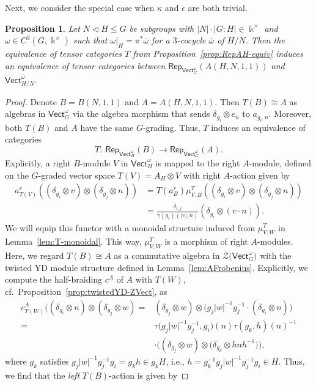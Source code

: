 \documentclass[10pt,a4paper]{amsart}
\numberwithin{equation}{section}
\newtheorem{Proposition}[Theorem]{Proposition}
 { \theoremstyle{definition}
\newtheorem{Definition}[Theorem]{Definition}
\newtheorem{Note}[Theorem]{Note}
\newtheorem{Notation}[Theorem]{Notation}
\newtheorem{Example}[Theorem]{Example}
\newtheorem{Remark}[Theorem]{Remark} }
\newcommand{\ov}[1]{\overline{#1}}
\newcommand{\Rep}{\mathsf{Rep}}
\newcommand{\Vect}{\mathsf{Vect}}
\newcommand{\cZ}{\mathcal{Z}}
\begin{document}
Next, we consider the special case when $\kappa$ and $\epsilon$ are both trivial.
\begin{Proposition}\label{prop:trivialdata}
 Let $N\triangleleft H\leq G$ be subgroups with $|N|\cdot |G:H|\in \Bbbk^\times$ and $\omega\in C^3(G,\Bbbk^\times)$ such that $\omega|_H=\pi^*\ov{\omega}$ for a $3$-cocycle $\ov{\omega}$ of $H/N$. Then the equivalence of tensor categories $T$ from Proposition~{\rm \ref{prop:RepAH-equiv}} induces an equivalence of tensor categories between $\Rep_{\Vect_G^\omega}(A(H,N,1,1))$ and~$\Vect_{H/N}^{\ov{\omega}}$.
\end{Proposition}
\begin{proof}
Denote $B=B(N,1,1)$ and $A=A(H,N,1,1)$. Then $T(B)\cong A$ as algebras in $\Vect_G^\omega$ via the algebra morphism that sends $\delta_{g_i}\otimes e_n$ to $a_{g_i,n}$. Moreover, both $T(B)$ and $A$ have the same $G$-grading. Thus, $T$ induces an equivalence of categories
\[T\colon\ \Rep_{\Vect_H^\omega}(B)\to \Rep_{\Vect_G^\omega}(A).\]
Explicitly, a right $B$-module $V$ in $\Vect_H^\omega$ is mapped to the right $A$-module, defined on the $G$-graded vector space $T(V)=A_H\otimes V$ with right $A$-action given by
\begin{align*} a_{T(V)}^r((\delta_{g_i}\otimes v)\otimes(\delta_{g_j}\otimes n))&=T(a^r_B)\mu_{V,B}^T((\delta_{g_i}\otimes v)\otimes(\delta_{g_j}\otimes n))\\
&=\frac{\delta_{i,j}}{\gamma(g_i)(|v|,n)}(\delta_{g_i}\otimes (v\cdot n)).
\end{align*}
We will equip this functor with a monoidal structure induced from $\mu_{V,W}^T$ in Lemma~\ref{lem:T-monoidal}. This way, $\mu_{V,W}^T$ is a morphism of right $A$-modules. Here, we regard $T(B)\cong A$ as a commutative algebra in $\cZ\big(\Vect_G^\omega\big)$ with the twisted YD module structure defined in Lemma~\ref{lem:AFrobenius}.
Explicitly, we compute the half-braiding $c^A$ of $A$ with $T(W)$, cf.\ Proposition~\ref{prop:twistedYD-ZVect}, as
\begin{align*}
 c^A_{T(W)}((\delta_{g_i}\otimes n)\otimes (\delta_{g_j}\otimes w)={}& (\delta_{g_j}\otimes w)\otimes \big(g_j|w|^{-1}g_j^{-1}\cdot (\delta_{g_i}\otimes n)\big)\\
 ={}&\tau\big(g_j|w|^{-1}g_j^{-1},g_i\big)(n)\tau(g_k,h)(n)^{-1}\\
 &\cdot \big((\delta_{g_j}\otimes w)\otimes \big(\delta_{g_k}\otimes hnh^{-1}\big)\big),
\end{align*}
where $g_{k}$ satisfies $g_j|w|^{-1}g_j^{-1}g_i=g_kh\in g_kH$, i.e., $h=g_k^{-1}g_j|w|^{-1}g_j^{-1}g_i\in H$. Thus, we find that the \emph{left} $T(B)$-action is given by

\end{proof}
\end{document}
